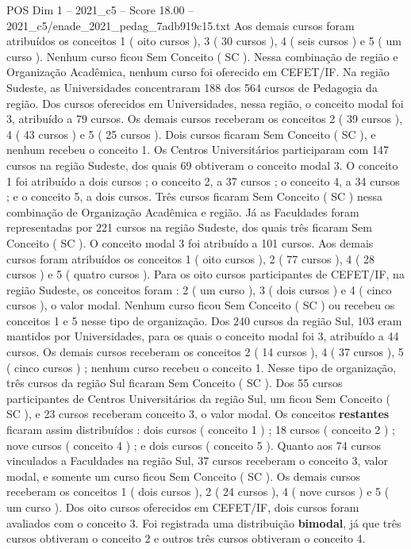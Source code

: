 \begin{textsample}{POS Dim 1 – 2021\_c5 – Score 18.00 – 2021\_c5/enade\_2021\_pedag\_7adb919c15.txt}
Aos demais cursos foram atribuídos os conceitos 1 ( oito cursos ), 3 ( 30 cursos ), 4 ( seis cursos ) e 5 ( um curso ).
Nenhum curso ficou Sem Conceito ( SC ).
Nessa combinação de região e Organização Acadêmica, nenhum curso foi oferecido em CEFET/IF.
Na região Sudeste, as Universidades concentraram 188 dos 564 cursos de Pedagogia da região.
Dos cursos oferecidos em Universidades, nessa região, o conceito modal foi 3, atribuído a 79 cursos.
Os demais cursos receberam os conceitos 2 ( 39 cursos ), 4 ( 43 cursos ) e 5 ( 25 cursos ).
Dois cursos ficaram Sem Conceito ( SC ), e nenhum recebeu o conceito 1.
Os Centros Universitários participaram com 147 cursos na região Sudeste, dos quais 69 obtiveram o conceito modal 3.
O conceito 1 foi atribuído a dois cursos ; o conceito 2, a 37 cursos ; o conceito 4, a 34 cursos ; e o conceito 5, a dois cursos.
Três cursos ficaram Sem Conceito ( SC ) nessa combinação de Organização Acadêmica e região.
Já as Faculdades foram representadas por 221 cursos na região Sudeste, dos quais três ficaram Sem Conceito ( SC ).
O conceito modal 3 foi atribuído a 101 cursos.
Aos demais cursos foram atribuídos os conceitos 1 ( oito cursos ), 2 ( 77 cursos ), 4 ( 28 cursos ) e 5 ( quatro cursos ).
Para os oito cursos participantes de CEFET/IF, na região Sudeste, os conceitos foram : 2 ( um curso ), 3 ( dois cursos ) e 4 ( cinco cursos ), o valor modal.
Nenhum curso ficou Sem Conceito ( SC ) ou recebeu os conceitos 1 e 5 nesse tipo de organização.
Dos 240 cursos da região Sul, 103 eram mantidos por Universidades, para os quais o conceito modal foi 3, atribuído a 44 cursos.
Os demais cursos receberam os conceitos 2 ( 14 cursos ), 4 ( 37 cursos ), 5 ( cinco cursos ) ; nenhum curso recebeu o conceito 1.
Nesse tipo de organização, três cursos da região Sul ficaram Sem Conceito ( SC ).
Dos 55 cursos participantes de Centros Universitários da região Sul, um ficou Sem Conceito ( SC ), e 23 cursos receberam conceito 3, o valor modal.
Os conceitos \textbf{restantes} ficaram assim distribuídos : dois cursos ( conceito 1 ) ; 18 cursos ( conceito 2 ) ; nove cursos ( conceito 4 ) ; e dois cursos ( conceito 5 ).
Quanto aos 74 cursos vinculados a Faculdades na região Sul, 37 cursos receberam o conceito 3, valor modal, e somente um curso ficou Sem Conceito ( SC ).
Os demais cursos receberam os conceitos 1 ( dois cursos ), 2 ( 24 cursos ), 4 ( nove cursos ) e 5 ( um curso ).
Dos oito cursos oferecidos em CEFET/IF, dois cursos foram avaliados com o conceito 3.
Foi registrada uma distribuição \textbf{bimodal}, já que três cursos obtiveram o conceito 2 e outros três cursos obtiveram o conceito 4.

\end{textsample}
